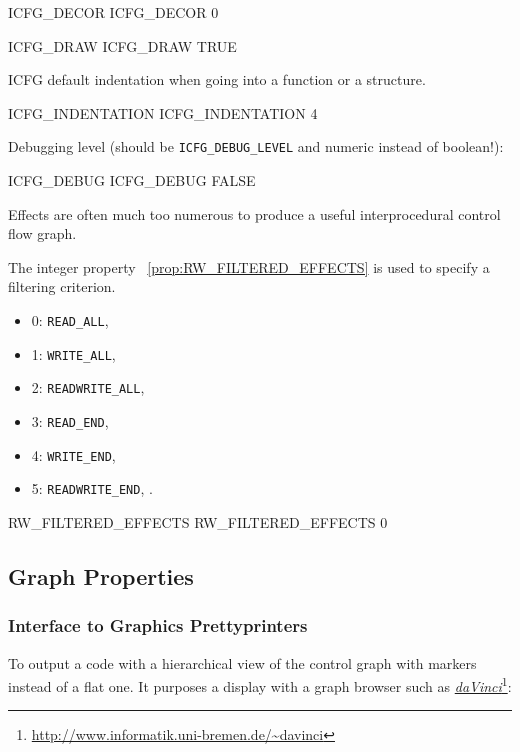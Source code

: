 \documentclass[a4paper]{report}
\newcommand{\PdaVinci}{\LINK{\emph{daVinci}}{http://www.informatik.uni-bremen.de/~davinci}}
\newcommand{\PipsPropRef}[1]{\texttt{\detokenize{#1}}~\ref{prop:#1}}
\newcommand{\LINK}[2]{\href{#2}{#1}\footnote{\url{#2}}\xspace}
\begin{document}
\begin{PipsProp}{ICFG_DECOR}
ICFG_DECOR 0
\end{PipsProp}

\begin{PipsProp}{ICFG_DRAW}
ICFG_DRAW TRUE
\end{PipsProp}

ICFG default indentation when going into a function or a structure.
\begin{PipsProp}{ICFG_INDENTATION}
ICFG_INDENTATION 4
\end{PipsProp}

Debugging level (should be \verb+ICFG_DEBUG_LEVEL+ and numeric instead
of boolean!):

\begin{PipsProp}{ICFG_DEBUG}
ICFG_DEBUG FALSE
\end{PipsProp}

Effects are often much too numerous to produce a useful interprocedural
control flow graph.

The integer property \PipsPropRef{RW_FILTERED_EFFECTS} is used to specify a
filtering criterion.
\begin{itemize}
\item 0: \verb/READ_ALL/,
\item 1: \verb/WRITE_ALL/,
\item 2: \verb/READWRITE_ALL/,
\item 3: \verb/READ_END/,
\item 4: \verb/WRITE_END/,
\item 5: \verb/READWRITE_END/, .
\end{itemize}

\begin{PipsProp}{RW_FILTERED_EFFECTS}
RW_FILTERED_EFFECTS 0
\end{PipsProp}

\subsection{Graph Properties}


\subsubsection{Interface to Graphics Prettyprinters}

To output a code with a hierarchical view of the control graph with
markers instead of a flat one. It purposes a display with a graph
browser such as \PdaVinci{}:
\end{document}
